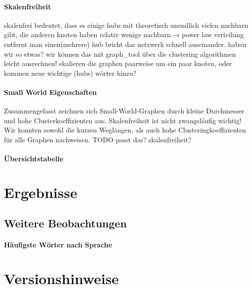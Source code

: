 \documentclass[12pt]{article}
\begin{document}
                             
\paragraph{Skalenfreiheit}
skalenfrei bedeutet, dass es einige hubs mit theoretisch unendlich vielen nachbarn gibt, die anderen knoten haben relativ wenige nachbarn.→ power law verteilung
entfernt man einen(mehrere) hub bricht das netzwerk schnell auseinander. haben wir so etwas? wir können das mit graph_tool über die clustering algorithmen leicht ausrechnen!
skalieren die graphen paarweise um ein paar knoten, oder kommen neue wichtige (hubs) wörter hinzu?

\paragraph{Small World Eigenschaften}
Zusammengefasst zeichnen sich Small-World-Graphen durch kleine Durchmesser und hohe Clusterkoeffizienten aus. Skalenfreiheit ist nicht zwangsläufig wichtig! Wir konnten sowohl die kurzen Weglängen, als auch hohe Clusteringkoeffizienten für alle Graphen nachweisen. TODO passt das? skalenfreiheit? 


\paragraph{Übersichtstabelle}

\section{Ergebnisse}

\subsection{Weitere Beobachtungen}

\paragraph{H\"aufigste W\"orter nach Sprache}







\section{Versionshinweise}




\cleardoublepage
{}
\nocite{*}
%
\end{document}
